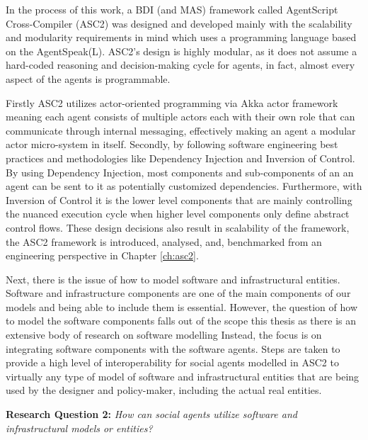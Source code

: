In the process of this work, a BDI (and MAS) framework called AgentScript Cross-Compiler (ASC2) was designed and developed mainly with the scalability and modularity requirements in mind which uses a programming language based on the AgentSpeak(L). ASC2's design is highly modular, as it does not assume a hard-coded reasoning and decision-making cycle for agents, in fact, almost every aspect of the agents is programmable. 

Firstly ASC2 utilizes actor-oriented programming via Akka actor framework meaning each agent consists of multiple actors each with their own role that can communicate through internal messaging, effectively making an agent a modular actor micro-system in itself. Secondly, by following software engineering best practices and methodologies like Dependency Injection and Inversion of Control. By using Dependency Injection, most components and sub-components of an an agent can be sent to it as potentially customized dependencies. Furthermore, with Inversion of Control it is the lower level components that are mainly controlling the nuanced execution cycle when higher level components only define abstract control flows. These design decisions also result in scalability of the framework, the ASC2 framework is introduced, analysed, and, benchmarked from an engineering perspective in Chapter \ref{ch:asc2}. 

Next, there is the issue of how to model software and infrastructural entities. Software and infrastructure components are one of the main components of our models and being able to include them is essential. However, the question of how to model the software components falls out of the scope this thesis as there is an extensive body of research on software modelling Instead, the focus is on integrating software components with the software agents. Steps are taken to provide a high level of interoperability for social agents modelled in ASC2 to virtually any type of model of software and infrastructural entities that are being used by the designer and policy-maker, including the actual real entities.

\begin{displayquote}
\textbf{Research Question 2:} \textit{How can social agents utilize software and infrastructural models or entities?}
\end{displayquote}

